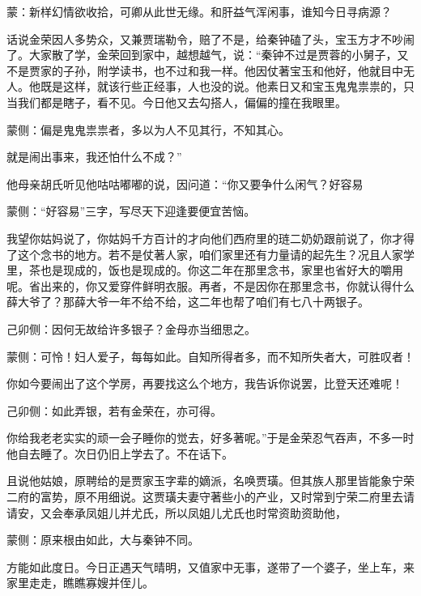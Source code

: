 

\begin{parag}
    \begin{note}蒙：新样幻情欲收拾，可卿从此世无缘。和肝益气浑闲事，谁知今日寻病源？\end{note}
\end{parag}


\begin{parag}
    话说金荣因人多势众，又兼贾瑞勒令，赔了不是，给秦钟磕了头，宝玉方才不吵闹了。大家散了学，金荣回到家中，越想越气，说：“秦钟不过是贾蓉的小舅子，又不是贾家的子孙，附学读书，也不过和我一样。他因仗著宝玉和他好，他就目中无人。他既是这样，就该行些正经事，人也没的说。他素日又和宝玉鬼鬼祟祟的，只当我们都是瞎子，看不见。今日他又去勾搭人，偏偏的撞在我眼里。\begin{note}蒙侧：偏是鬼鬼祟祟者，多以为人不见其行，不知其心。\end{note}就是闹出事来，我还怕什么不成？”
\end{parag}


\begin{parag}
    他母亲胡氏听见他咕咕嘟嘟的说，因问道：“你又要争什么闲气？好容易\begin{note}蒙侧：“好容易”三字，写尽天下迎逢要便宜苦恼。\end{note}我望你姑妈说了，你姑妈千方百计的才向他们西府里的琏二奶奶跟前说了，你才得了这个念书的地方。若不是仗著人家，咱们家里还有力量请的起先生？况且人家学里，茶也是现成的，饭也是现成的。你这二年在那里念书，家里也省好大的嚼用呢。省出来的，你又爱穿件鲜明衣服。再者，不是因你在那里念书，你就认得什么薛大爷了？那薛大爷一年不给不给，这二年也帮了咱们有七八十两银子。\begin{note}己卯侧：因何无故给许多银子？金母亦当细思之。\end{note}\begin{note}蒙侧：可怜！妇人爱子，每每如此。自知所得者多，而不知所失者大，可胜叹者！\end{note}你如今要闹出了这个学房，再要找这么个地方，我告诉你说罢，比登天还难呢！\begin{note}己卯侧：如此弄银，若有金荣在，亦可得。\end{note}你给我老老实实的顽一会子睡你的觉去，好多著呢。”于是金荣忍气吞声，不多一时他自去睡了。次日仍旧上学去了。不在话下。
\end{parag}


\begin{parag}
    且说他姑娘，原聘给的是贾家玉字辈的嫡派，名唤贾璜。但其族人那里皆能象宁荣二府的富势，原不用细说。这贾璜夫妻守著些小的产业，又时常到宁荣二府里去请请安，又会奉承凤姐儿并尤氏，所以凤姐儿尤氏也时常资助资助他，\begin{note}蒙侧：原来根由如此，大与秦钟不同。\end{note}方能如此度日。今日正遇天气晴明，又值家中无事，遂带了一个婆子，坐上车，来家里走走，瞧瞧寡嫂并侄儿。
\end{parag}


